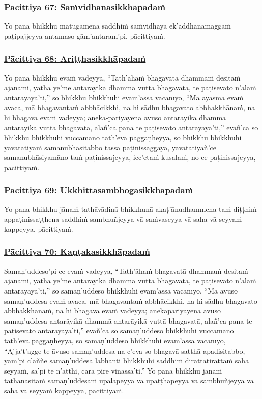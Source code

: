 \subsubsection*{\hyperref[exp67]{Pācittiya 67: Saṁvidhānasikkhāpadaṁ}}
\label{pac67}
Yo pana bhikkhu mātugāmena saddhiṁ saṁvidhāya ek'addhānamaggaṁ paṭipajjeyya antamaso gām'antaram'pi, pācittiyaṁ.

\subsubsection*{\hyperref[exp68]{Pācittiya 68: Ariṭṭhasikkhāpadaṁ}}
\label{pac68}
Yo pana bhikkhu evaṁ vadeyya, ``Tath'āhaṁ bhagavatā dhammaṁ desitaṁ ājānāmi, yathā ye'me antarāyikā dhammā vuttā bhagavatā, te paṭisevato n'ālaṁ antarāyāyā'ti,'' so bhikkhu bhikkhūhi evam'assa vacanīyo, ``Mā āyasmā evaṁ avaca, mā bhagavantaṁ abbhācikkhi, na hi sādhu bhagavato abbhakkhānaṁ, na hi bhagavā evaṁ vadeyya; aneka-pariyāyena āvuso antarāyikā dhammā antarāyikā vuttā bhagavatā, alañ'ca pana te paṭisevato antarāyāyā'ti,'' evañ'ca so bhikkhu bhikkhūhi vuccamāno tath'eva paggaṇheyya, so bhikkhu bhikkhūhi yāvatatiyaṁ samanubhāsitabbo tassa paṭinissaggāya, yāvatatiyañ'ce samanubhāsiyamāno taṁ paṭinissajeyya, icc'etaṁ kusalaṁ, no ce paṭinissajeyya, pācittiyaṁ.

\subsubsection*{\hyperref[exp69]{Pācittiya 69: Ukkhittasambhogasikkhāpadaṁ}}
\label{pac69}
Yo pana bhikkhu jānaṁ tathāvādinā bhikkhunā akaṭ'ānudhammena taṁ diṭṭhiṁ appaṭinissaṭṭhena saddhiṁ sambhuñjeyya vā saṁvaseyya vā saha vā seyyaṁ kappeyya, pācittiyaṁ.

\subsubsection*{\hyperref[exp70]{Pācittiya 70: Kaṇṭakasikkhāpadaṁ}}
\label{pac70}
Samaṇ'uddeso'pi ce evaṁ vadeyya, ``Tath'āhaṁ bhagavatā dhammaṁ desitaṁ ājānāmi, yathā ye'me antarāyikā dhammā vuttā bhagavatā, te paṭisevato n'ālaṁ antarāyāyā'ti,'' so samaṇ'uddeso bhikkhūhi evam'assa vacanīyo, ``Mā āvuso samaṇ'uddesa evaṁ avaca, mā bhagavantaṁ abbhācikkhi, na hi sādhu bhagavato abbhakkhānaṁ, na hi bhagavā evaṁ vadeyya; anekapariyāyena āvuso samaṇ'uddesa antarāyikā dhammā antarāyikā vuttā bhagavatā, alañ'ca pana te paṭisevato antarāyāyā'ti,'' evañ'ca so samaṇ'uddeso bhikkhūhi vuccamāno tath'eva paggaṇheyya, so samaṇ'uddeso bhikkhūhi evam'assa vacanīyo, ``Ajja't'agge te āvuso samaṇ'uddesa na c'eva so bhagavā satthā apadisitabbo, yam'pi c'aññe samaṇ'uddesā labhanti bhikkhūhi saddhiṁ dirattatirattaṁ saha seyyaṁ, sā'pi te n'atthi, cara pire vinassā'ti.'' Yo pana bhikkhu jānaṁ tathānāsitaṁ samaṇ'uddesaṁ upalāpeyya vā upaṭṭhāpeyya vā sambhuñjeyya vā saha vā seyyaṁ kappeyya, pācittiyaṁ.

